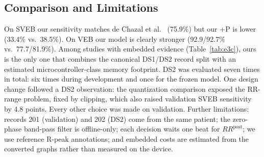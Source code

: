 \documentclass[conference]{IEEEtran}
\begin{document}
\begin{table}[t]
\caption{Ablations (INT8 Ensembles; Validation Selects, DS2 Reports, \%)}
\label{tab:ablation}
\centering
\footnotesize
\setlength{\tabcolsep}{2.2pt}
\end{table}

\subsection{Comparison and Limitations}
\label{sec:limits}
On SVEB our sensitivity matches de Chazal et al.~\cite{dechazal2004automatic} (75.9\%) but our +P is lower (33.4\% vs.\ 38.5\%). On VEB our model is clearly stronger (92.9/92.7\% vs.\ 77.7/81.9\%). Among studies with embedded evidence (Table~\ref{tab:e3c}), ours is the only one that combines the canonical DS1/DS2 record split with an estimated microcontroller-class memory footprint. DS2 was evaluated seven times in total: six times during development and once for the frozen model. One design change followed a DS2 observation: the quantization comparison exposed the RR-range problem, fixed by clipping, which also raised validation SVEB sensitivity by 4.8 points. Every other choice was made on validation. Further limitations: records 201 (validation) and 202 (DS2) come from the same patient; the zero-phase band-pass filter is offline-only; each decision waits one beat for $RR^{\mathrm{post}}$; we use reference R-peak annotations; and embedded costs are estimated from the converted graphs rather than measured on the device.

\end{document}
